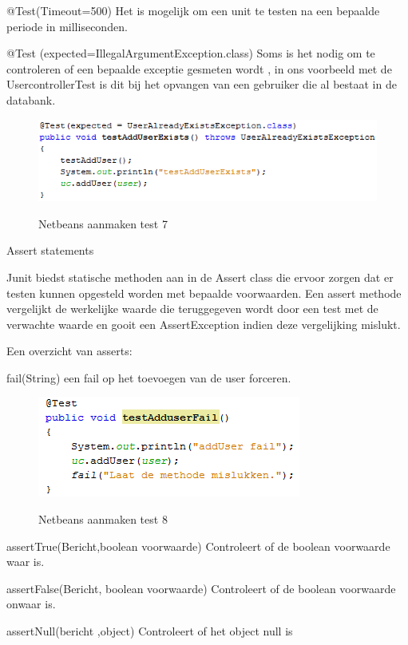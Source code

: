 \documentclass[pdftex,a4paper,12pt,twoside]{report}
\begin{document}
@Test(Timeout=500)
Het is mogelijk om een unit te testen na een bepaalde periode in milliseconden.

@Test (expected=IllegalArgumentException.class)
Soms is het nodig om te controleren of een bepaalde exceptie gesmeten wordt , in ons voorbeeld met de UsercontrollerTest is dit bij het opvangen van een gebruiker die al bestaat in de databank.

\begin{figure}[!htb]
\includegraphics{images/junit3.png}\\
\caption{Netbeans aanmaken test 7}
\end{figure}

Assert statements

Junit biedst statische methoden aan in de Assert class die ervoor zorgen dat er testen kunnen opgesteld worden met bepaalde voorwaarden.
Een assert methode vergelijkt de werkelijke waarde die teruggegeven wordt door een test met de verwachte waarde en gooit een AssertException indien deze vergelijking mislukt.

Een overzicht van asserts:

fail(String)
een fail op het toevoegen van de user forceren.

\begin{figure}[!htb]
\includegraphics{images/adduserfail.png}\\
\caption{Netbeans aanmaken test 8}
\end{figure}

assertTrue(Bericht,boolean voorwaarde)
Controleert of de boolean voorwaarde waar is.

assertFalse(Bericht, boolean voorwaarde)
Controleert of de boolean voorwaarde onwaar is.

assertNull(bericht ,object)
Controleert of het object null is
\end{document}
